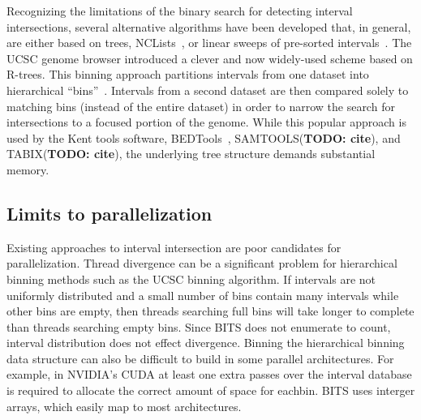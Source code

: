 \documentclass{bioinfo}
\begin{document}
	Recognizing the limitations of the binary search for detecting interval intersections, several alternative algorithms 
	have been developed that, in general, are either based on trees, NCLists~\citep{alekseyenko2007}, or linear sweeps of 
	pre-sorted intervals~\citep{richardson2006}. The UCSC genome browser introduced a clever and now widely-used 
	scheme based on R-trees. This binning approach partitions intervals from one dataset into hierarchical ``bins''~\citep{kent2002}.  
	Intervals from a second dataset are then compared solely to matching bins (instead of the 
	entire dataset) in order to narrow the search for intersections to a focused portion of the genome.  
	While this popular approach is used by the Kent tools software, BEDTools~\citep{quinlan2010}, 
	SAMTOOLS(\textbf{TODO: cite}), and TABIX(\textbf{TODO: cite}), the underlying tree structure 
	demands substantial memory. 


	\subsection{Limits to parallelization}

	Existing approaches to interval intersection are poor candidates for
	parallelization.  Thread divergence can be a significant problem for
	hierarchical binning methods such as the UCSC binning algorithm.  If intervals
	are not uniformly distributed and a small number of bins contain many intervals
	while other bins are empty, then threads searching full bins will take longer to
	complete than threads searching empty bins.  Since BITS does not enumerate to
	count, interval distribution does not effect divergence.  Binning the 
	hierarchical binning data structure can also be difficult to build in some
	parallel architectures.  For example, in NVIDIA's CUDA at least one extra passes
	over the interval database is required to allocate the correct amount of space 
	for eachbin.  BITS uses interger arrays, which easily map to most architectures.
\end{document}
